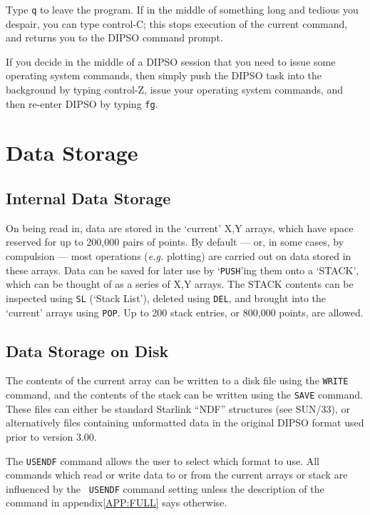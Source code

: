 \documentclass[twoside,11pt]{article}
\newcommand{\hyperref}[4]{#2\ref{#4}#3}
\newcommand{\htmlref}[2]{#1}
\newcommand{\xref}[3]{#1}
\renewcommand{\_}{\texttt{\symbol{95}}}
\begin{document}
Type {\tt{q}}  to leave the program. If in the middle of something long and
tedious you despair, you can type control-C; this stops execution of the current
command, and returns you to the DIPSO command prompt.

If you decide in the middle of a DIPSO session that you need to issue some
operating system commands, then simply push the DIPSO task into the background
by typing control-Z,
issue your operating system commands, and then re-enter DIPSO by typing {\tt{fg}}. 

\section {Data Storage}

\subsection{Internal Data Storage}

On being read in, data are stored in the `current' X,Y arrays, which have
space reserved for up to 200,000 pairs of points. By default --- or, in
some cases, by compulsion --- most operations ({\em e.g.} plotting) are
carried out on data stored in these arrays. Data can be saved for later
use by `\htmlref{{\tt{PUSH}}}{COM:PUSH}'ing  them onto a `STACK', which can
be thought of as a series of X,Y arrays. The STACK contents can be
inspected using \htmlref{{\tt{SL}}}{COM:SL}  (`Stack List'), deleted using
\htmlref{{\tt{DEL}}}{COM:DEL},  and brought into the `current' arrays using
\htmlref{{\tt{POP}}}{COM:POP}.  Up to 200 stack entries, or 800,000 points,
are allowed.

\subsection{Data Storage on Disk}

The contents of the current array can be written to a disk file using the
\htmlref{{\tt{WRITE}}}{COM:WRITE}  command, and the contents of the stack
can be written using the \htmlref{{\tt{SAVE}}}{COM:SAVE}  command. These
files can either be standard Starlink ``NDF'' structures (see
\xref{SUN/33}{sun33}{}), or alternatively files containing unformatted data
in the original DIPSO format used prior to version 3.00.

The \htmlref{{\tt{USENDF}}}{COM:USENDF}  command allows the user to select
which format to use. All commands which read or write data to or from the
current arrays or stack are influenced by the \htmlref{{\tt
USENDF}}{COM:USENDF} command setting unless the \hyperref{description of the
command}{description of the command in appendix}{}{APP:FULL} says otherwise.
\end{document}

